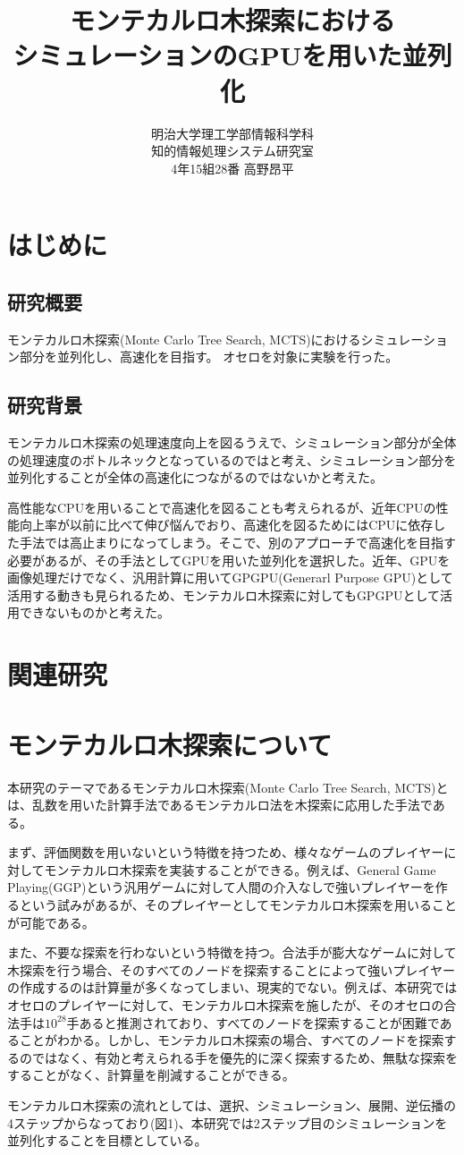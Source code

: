 \documentclass[10pt, a4paper]{jsarticle}
\title{モンテカルロ木探索における\\シミュレーションのGPUを用いた並列化}
\author{明治大学理工学部情報科学科\\知的情報処理システム研究室\\4年15組28番 高野昂平}
\date{}
\begin{document}
\maketitle
\tableofcontents
\newpage
\section{はじめに}
\subsection{研究概要}
モンテカルロ木探索(Monte Carlo Tree Search, MCTS)におけるシミュレーション部分を並列化し、高速化を目指す。
オセロを対象に実験を行った。
\subsection{研究背景}
モンテカルロ木探索の処理速度向上を図るうえで、シミュレーション部分が全体の処理速度のボトルネックとなっているのではと考え、シミュレーション部分を並列化することが全体の高速化につながるのではないかと考えた。\par
高性能なCPUを用いることで高速化を図ることも考えられるが、近年CPUの性能向上率が以前に比べて伸び悩んでおり、高速化を図るためにはCPUに依存した手法では高止まりになってしまう。そこで、別のアプローチで高速化を目指す必要があるが、その手法としてGPUを用いた並列化を選択した。近年、GPUを画像処理だけでなく、汎用計算に用いてGPGPU(Generarl Purpose GPU)として活用する動きも見られるため、モンテカルロ木探索に対してもGPGPUとして活用できないものかと考えた。
\section{関連研究}
\section{モンテカルロ木探索について}
本研究のテーマであるモンテカルロ木探索(Monte Carlo Tree Search, MCTS)とは、乱数を用いた計算手法であるモンテカルロ法を木探索に応用した手法である。\par
まず、評価関数を用いないという特徴を持つため、様々なゲームのプレイヤーに対してモンテカルロ木探索を実装することができる。例えば、General Game Playing(GGP)という汎用ゲームに対して人間の介入なしで強いプレイヤーを作るという試みがあるが、そのプレイヤーとしてモンテカルロ木探索を用いることが可能である。\par
また、不要な探索を行わないという特徴を持つ。合法手が膨大なゲームに対して木探索を行う場合、そのすべてのノードを探索することによって強いプレイヤーの作成するのは計算量が多くなってしまい、現実的でない。例えば、本研究ではオセロのプレイヤーに対して、モンテカルロ木探索を施したが、そのオセロの合法手は$10^{28}$手あると推測されており、すべてのノードを探索することが困難であることがわかる。しかし、モンテカルロ木探索の場合、すべてのノードを探索するのではなく、有効と考えられる手を優先的に深く探索するため、無駄な探索をすることがなく、計算量を削減することができる。\par
モンテカルロ木探索の流れとしては、選択、シミュレーション、展開、逆伝播の4ステップからなっており(図1)、本研究では2ステップ目のシミュレーションを並列化することを目標としている。
\end{document}

